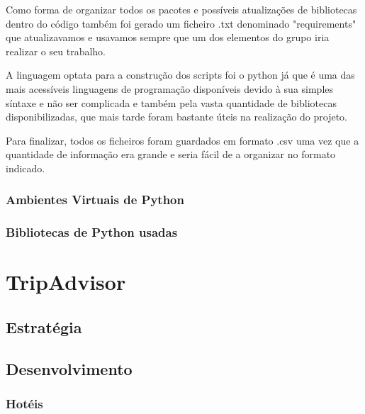 \documentclass[a4paper,10pt]{article}
\begin{document}
Como forma de organizar todos os pacotes e possíveis atualizações de bibliotecas dentro do código também foi gerado um ficheiro .txt denominado "requirements" que atualizavamos e usavamos sempre que um dos elementos do grupo iria realizar o seu trabalho. 

A linguagem optata para a construção dos scripts foi o python já que é uma das mais acessíveis linguagens de programação disponíveis devido à sua simples síntaxe e não ser complicada e também pela vasta quantidade de bibliotecas disponibilizadas, que mais tarde foram bastante úteis na realização do projeto.

Para finalizar, todos os ficheiros foram guardados em formato .csv uma vez que a quantidade de informação era grande e seria fácil de a organizar no formato indicado.

\subsubsection{Ambientes Virtuais de Python}

\subsubsection{Bibliotecas de Python usadas}

\newpage

\section{TripAdvisor}

\subsection{Estratégia}

\subsection{Desenvolvimento}

\newpage

\subsubsection{Hotéis}
\end{document}
